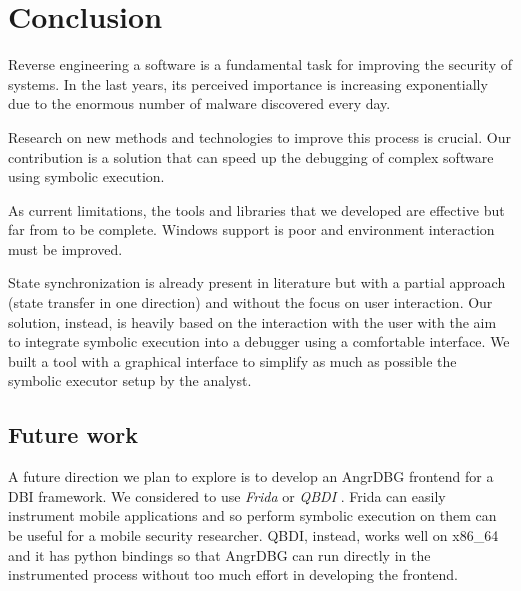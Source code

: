 \chapter{Conclusion}

Reverse engineering a software is a fundamental task for improving the security of systems. In the last years, its perceived importance is increasing exponentially due to the enormous number of malware discovered every day.

Research on new methods and technologies to improve this process is crucial. Our contribution is a solution that can speed up the debugging of complex software using symbolic execution.

As current limitations, the tools and libraries that we developed are effective but far from to be complete. Windows support is poor and environment interaction must be improved.

State synchronization is already present in literature \cite{muench:bar18} but with a partial approach (state transfer in one direction) and without the focus on user interaction. Our solution, instead, is heavily based on the interaction with the user with the aim to integrate symbolic execution into a debugger using a comfortable interface. We built a tool with a graphical interface to simplify as much as possible the symbolic executor setup by the analyst.

\section{Future work}


A future direction we plan to explore is to develop an AngrDBG frontend for a DBI framework. We considered to use {\em Frida} \cite{Frida} or {\em QBDI} \cite{qbdi}. Frida can easily instrument mobile applications and so perform symbolic execution on them can be useful for a mobile security researcher. QBDI, instead, works well on x86\_64 and it has python bindings so that AngrDBG can run directly in the instrumented process without too much effort in developing the frontend.

